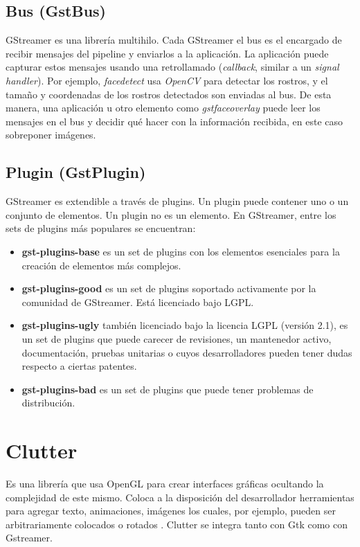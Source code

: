 \documentclass[a4paper,openright,12pt]{report}
\begin{document}
\subsection{Bus (GstBus)}
GStreamer es una librería multihilo. Cada GStreamer el bus es el encargado de
recibir mensajes del pipeline y enviarlos a la aplicación. La aplicación puede
capturar estos mensajes usando una retrollamado (\textit{callback}, similar a un
\textit{signal handler}). Por ejemplo, \textit{facedetect} usa \textit{OpenCV}
para detectar los rostros, y el tamaño y coordenadas de los rostros detectados
son enviadas al bus. De esta manera, una aplicación u otro elemento como
\textit{gstfaceoverlay} puede leer los mensajes en el bus y decidir qué hacer
con la información recibida, en este caso sobreponer imágenes.
\subsection{Plugin (GstPlugin)}
GStreamer es extendible a través de plugins. Un plugin puede contener uno o un
conjunto de elementos. Un plugin no es un elemento. En GStreamer, entre los
sets de plugins más populares se encuentran:
\begin{itemize}
\item \textbf{gst-plugins-base} es un set de plugins con los elementos esenciales para
la creación de elementos más complejos.
\item \textbf{gst-plugins-good} es un set de plugins soportado activamente por
la comunidad de GStreamer. Está licenciado bajo LGPL.
\item \textbf{gst-plugins-ugly} también licenciado bajo la licencia LGPL
(versión 2.1), es un set de plugins que puede carecer de revisiones, un
mantenedor activo, documentación, pruebas unitarias o cuyos desarrolladores
pueden tener dudas respecto a ciertas patentes.
\item \textbf{gst-plugins-bad} es un set de plugins que puede tener problemas
de distribución.
\end{itemize}
\section{Clutter}
Es una librería que usa OpenGL para crear interfaces gráficas ocultando la
complejidad de este mismo. Coloca a la disposición del desarrollador
herramientas para agregar texto, animaciones, imágenes los cuales, por ejemplo,
pueden ser arbitrariamente colocados o rotados \cite{clutterOverview}. Clutter
se integra tanto con Gtk como con Gstreamer.
\end{document}
